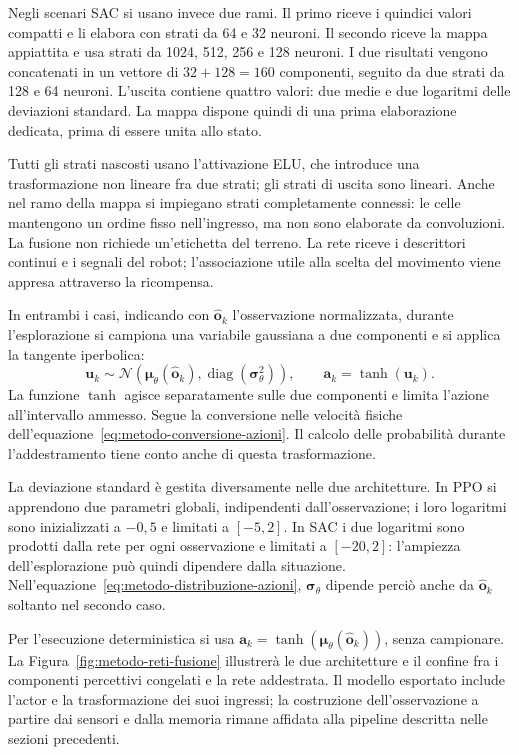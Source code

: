 Negli scenari SAC si usano invece due rami. Il primo riceve i quindici valori compatti e li elabora con strati da 64 e 32 neuroni. Il secondo riceve la mappa appiattita e usa strati da 1024, 512, 256 e 128 neuroni. I due risultati vengono concatenati in un vettore di $32+128=160$ componenti, seguito da due strati da 128 e 64 neuroni. L'uscita contiene quattro valori: due medie e due logaritmi delle deviazioni standard. La mappa dispone quindi di una prima elaborazione dedicata, prima di essere unita allo stato.

Tutti gli strati nascosti usano l'attivazione ELU, che introduce una trasformazione non lineare fra due strati; gli strati di uscita sono lineari. Anche nel ramo della mappa si impiegano strati completamente connessi: le celle mantengono un ordine fisso nell'ingresso, ma non sono elaborate da convoluzioni. La fusione non richiede un'etichetta del terreno. La rete riceve i descrittori continui e i segnali del robot; l'associazione utile alla scelta del movimento viene appresa attraverso la ricompensa.

In entrambi i casi, indicando con $\widehat{\mathbf o}_k$ l'osservazione normalizzata, durante l'esplorazione si campiona una variabile gaussiana a due componenti e si applica la tangente iperbolica:
\begin{equation}
    \mathbf u_k\sim\mathcal N\!\left(
       \boldsymbol\mu_\theta(\widehat{\mathbf o}_k),
       \operatorname{diag}(\boldsymbol\sigma_\theta^2)\right),
    \qquad \mathbf a_k=\tanh(\mathbf u_k).
    \label{eq:metodo-distribuzione-azioni}
\end{equation}
La funzione $\tanh$ agisce separatamente sulle due componenti e limita l'azione all'intervallo ammesso. Segue la conversione nelle velocità fisiche dell'equazione~\eqref{eq:metodo-conversione-azioni}. Il calcolo delle probabilità durante l'addestramento tiene conto anche di questa trasformazione.

La deviazione standard è gestita diversamente nelle due architetture. In PPO si apprendono due parametri globali, indipendenti dall'osservazione; i loro logaritmi sono inizializzati a $-0{,}5$ e limitati a $[-5,2]$. In SAC i due logaritmi sono prodotti dalla rete per ogni osservazione e limitati a $[-20,2]$: l'ampiezza dell'esplorazione può quindi dipendere dalla situazione. Nell'equazione~\eqref{eq:metodo-distribuzione-azioni}, $\boldsymbol\sigma_\theta$ dipende perciò anche da $\widehat{\mathbf o}_k$ soltanto nel secondo caso.

Per l'esecuzione deterministica si usa $\mathbf a_k=\tanh(\boldsymbol\mu_\theta(\widehat{\mathbf o}_k))$, senza campionare. La Figura~\ref{fig:metodo-reti-fusione} illustrerà le due architetture e il confine fra i componenti percettivi congelati e la rete addestrata. Il modello esportato include l'actor e la trasformazione dei suoi ingressi; la costruzione dell'osservazione a partire dai sensori e dalla memoria rimane affidata alla pipeline descritta nelle sezioni precedenti.

